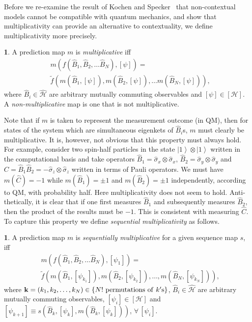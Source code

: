 \documentclass[british,aps,prl,superscriptaddress,nofootinbib,times,reprint]{revtex4-1}
\theoremstyle{plain}
\theoremstyle{definition}
\newtheorem{defn}[thm]{\protect\definitionname}
\theoremstyle{remark}
\theoremstyle{plain}
\theoremstyle{plain}
\theoremstyle{plain}
\theoremstyle{definition}
\theoremstyle{definition}
\providecommand{\definitionname}{Definition}
\begin{document}
Before we re-examine the result of Kochen and
Specker~\cite{KochenSpecker} that non-contextual
models cannot be compatible with quantum
mechanics, and show that multiplicativity can provide an
alternative to contextuality, we define
multiplicativity more precisely.
\begin{defn}
A prediction map $m$ is \emph{multiplicative} iff
\begin{align*} &
m(f(\hat{B}_{1},\hat{B}_{2},\dots\hat{B}_{N}),[\psi])
= \\ & \tilde
f(m(\hat{B}_{1},[\psi]),m(\hat{B}_{2},[\psi]),\dots
m(\hat{B}_{N},[\psi])), \end{align*}
where $\hat{B}_{i}\in\hat{\mathcal{H}}$ are
arbitrary mutually commuting observables and
$[\psi]\in[\mathcal{H}]$. A
\emph{non-multiplicative} map is one that is not
multiplicative.  
\end{defn} 
Note that if $m$ is taken to represent the
measurement outcome (in QM), then for states of
the system which are simultaneous eigenkets of
$\hat{B}_{i}$s, $m$ must clearly be
multiplicative. It is, however, not obvious that
this property must always hold. For example,
consider two spin-half particles in the state 
$\left|1\right\rangle \otimes\left|1\right\rangle
$ written in the computational basis and take
operators 
$\hat{B}_{1}=\hat{\sigma}_{x}\otimes\hat{\sigma}_{x}$,
$\hat{B}_{2}=\hat{\sigma}_{y}\otimes\hat{\sigma}_{y}$
and
$\hat{C}=\hat{B}_{1}\hat{B}_{2}=-\hat{\sigma}_{z}\otimes\hat{\sigma}_{z}$
written in terms of Pauli operators.
We must have $m(\hat{C})=-1$ while
$m(\hat{B}_{1})=\pm1$ and $m(\hat{B}_{2})=\pm1$
independently, according to QM, with probability
half. Here multiplicativity does not seem to hold.
Anti-thetically, it is clear that if one first
measures $\hat{B}_{1}$ and subsequently measures
$\hat{B}_{2}$, then the product of the results
must be $-1$. This is consistent with measuring
$\hat{C}$. To capture this property we define
\emph{sequential multiplicativity} as follows.
\begin{defn} 
A prediction map $m$ is
\emph{sequentially multiplicative} for a given
sequence map $s$, iff \begin{align*}
&m(f(\hat{B}_{1},\hat{B}_{2},\dots\hat{B}_{N}),[\psi_{1}])=\\
&\tilde
f(m(\hat{B}_{1},[\psi_{k_{1}}]),m(\hat{B}_{2},[\psi_{k_{2}}]),\dots,m(\hat{B}_{N},[\psi_{k_{N}}])),
\end{align*} 
where
$\mathbf{k}=(k_{1},k_{2},\dots,k_{N})\in\{
N! {\rm ~permutations~of~}  k'{\rm s}
\}$, $\hat{B}_{i}\in\hat{\mathcal{H}}$ are
arbitrary mutually commuting observables,
$[\psi_{i}]\in[\mathcal{H}]$ and
$[\psi_{k+1}]\equiv
s(\hat{B}_{k},[\psi_{k}],m(\hat{B}_{k},[\psi_{k}]))$,
$\forall\,[\psi_{i}]$.  
\end{defn} 
\end{document}
